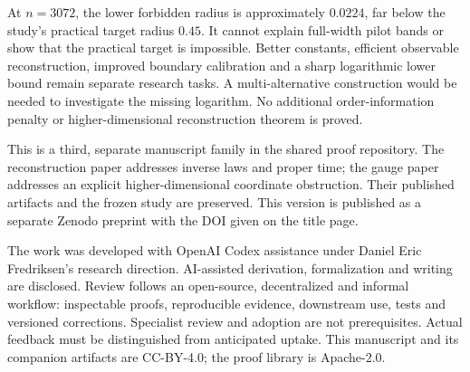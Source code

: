 \documentclass[11pt]{article}
\theoremstyle{remark}
\begin{document}
At $n=3072$, the lower forbidden radius is approximately $0.0224$,
far below the study's practical target radius $0.45$.
It cannot explain full-width pilot bands or show that the practical
target is impossible. Better constants, efficient observable
reconstruction, improved boundary calibration and a sharp logarithmic
lower bound remain separate research tasks. A multi-alternative
construction would be needed to investigate the missing logarithm.
No additional order-information penalty or higher-dimensional
reconstruction theorem is proved.

This is a third, separate manuscript family in the shared proof
repository. The reconstruction paper \cite{Reconstruction} addresses
inverse laws and proper time; the gauge paper \cite{Gauge} addresses
an explicit higher-dimensional coordinate obstruction. Their published
artifacts and the frozen study are preserved. This version is published as a separate Zenodo preprint
with the DOI given on the title page.

The work was developed with OpenAI Codex assistance under Daniel Eric
Fredriksen's research direction. AI-assisted derivation, formalization
and writing are disclosed. Review follows an open-source,
decentralized and informal workflow: inspectable proofs, reproducible
evidence, downstream use, tests and versioned corrections. Specialist
review and adoption are not prerequisites. Actual feedback must be
distinguished from anticipated uptake. This manuscript and its
companion artifacts are CC-BY-4.0; the proof library is Apache-2.0.
\end{document}
